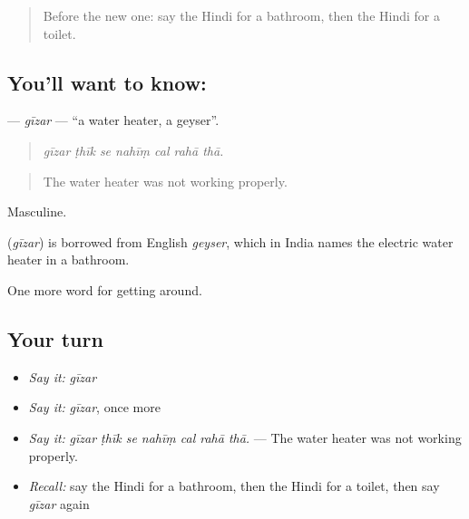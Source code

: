 \label{lesson:HI-C414-gizar}



\begin{quote}
Before the new one: say the Hindi for a bathroom, then the Hindi for a toilet.
\end{quote}

\subsection*{You'll want to know: }
\textbf{} — \emph{gīzar} — \textquotedblleft{}a water heater, a geyser\textquotedblright{}.

\begin{quote}
      
\end{quote}

\begin{quote}
\emph{gīzar ṭhīk se nahīṃ cal rahā thā.}
\end{quote}

\begin{quote}
The water heater was not working properly.
\end{quote}

Masculine.

\begin{cousinweb}
\textbf{} (\emph{gīzar}) is borrowed from English \emph{geyser}, which in India names the electric water heater in a bathroom.
\end{cousinweb}

\begin{grammarlens}[title={What you've built}]
One more word for getting around.
\end{grammarlens}

\subsection*{Your turn}
\begin{itemize}
\raggedright
  \item \emph{Say it:} \emph{gīzar}
  \item \emph{Say it:} \emph{gīzar}, once more
  \item \emph{Say it:} \emph{gīzar ṭhīk se nahīṃ cal rahā thā.} — The water heater was not working properly.
  \item \emph{Recall:} say the Hindi for a bathroom, then the Hindi for a toilet, then say \emph{gīzar} again
\end{itemize}

